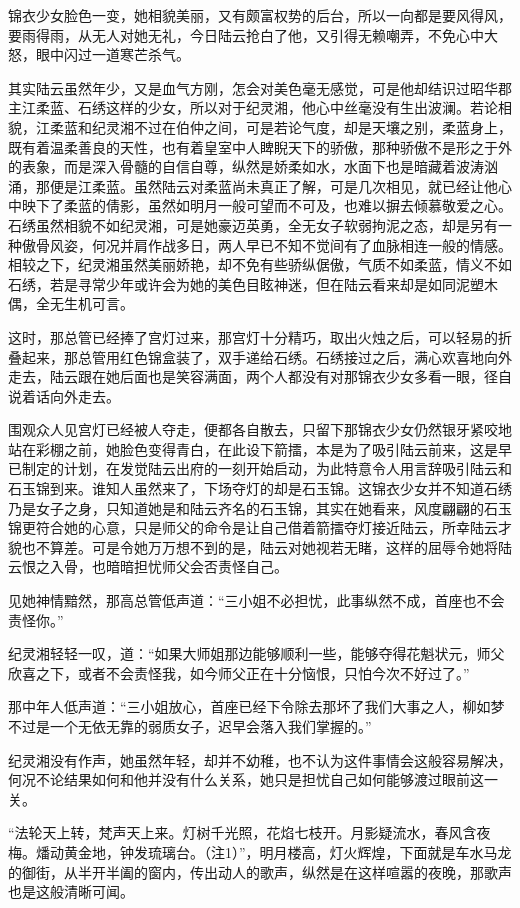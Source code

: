 锦衣少女脸色一变，她相貌美丽，又有颇富权势的后台，所以一向都是要风得风，要雨得雨，从无人对她无礼，今日陆云抢白了他，又引得无赖嘲弄，不免心中大怒，眼中闪过一道寒芒杀气。

其实陆云虽然年少，又是血气方刚，怎会对美色毫无感觉，可是他却结识过昭华郡主江柔蓝、石绣这样的少女，所以对于纪灵湘，他心中丝毫没有生出波澜。若论相貌，江柔蓝和纪灵湘不过在伯仲之间，可是若论气度，却是天壤之别，柔蓝身上，既有着温柔善良的天性，也有着皇室中人睥睨天下的骄傲，那种骄傲不是形之于外的表象，而是深入骨髓的自信自尊，纵然是娇柔如水，水面下也是暗藏着波涛汹涌，那便是江柔蓝。虽然陆云对柔蓝尚未真正了解，可是几次相见，就已经让他心中映下了柔蓝的倩影，虽然如明月一般可望而不可及，也难以摒去倾慕敬爱之心。石绣虽然相貌不如纪灵湘，可是她豪迈英勇，全无女子软弱拘泥之态，却是另有一种傲骨风姿，何况并肩作战多日，两人早已不知不觉间有了血脉相连一般的情感。相较之下，纪灵湘虽然美丽娇艳，却不免有些骄纵倨傲，气质不如柔蓝，情义不如石绣，若是寻常少年或许会为她的美色目眩神迷，但在陆云看来却是如同泥塑木偶，全无生机可言。

这时，那总管已经捧了宫灯过来，那宫灯十分精巧，取出火烛之后，可以轻易的折叠起来，那总管用红色锦盒装了，双手递给石绣。石绣接过之后，满心欢喜地向外走去，陆云跟在她后面也是笑容满面，两个人都没有对那锦衣少女多看一眼，径自说着话向外走去。

围观众人见宫灯已经被人夺走，便都各自散去，只留下那锦衣少女仍然银牙紧咬地站在彩棚之前，她脸色变得青白，在此设下箭擂，本是为了吸引陆云前来，这是早已制定的计划，在发觉陆云出府的一刻开始启动，为此特意令人用言辞吸引陆云和石玉锦到来。谁知人虽然来了，下场夺灯的却是石玉锦。这锦衣少女并不知道石绣乃是女子之身，只知道她是和陆云齐名的石玉锦，其实在她看来，风度翩翩的石玉锦更符合她的心意，只是师父的命令是让自己借着箭擂夺灯接近陆云，所幸陆云才貌也不算差。可是令她万万想不到的是，陆云对她视若无睹，这样的屈辱令她将陆云恨之入骨，也暗暗担忧师父会否责怪自己。

见她神情黯然，那高总管低声道：“三小姐不必担忧，此事纵然不成，首座也不会责怪你。”

纪灵湘轻轻一叹，道：“如果大师姐那边能够顺利一些，能够夺得花魁状元，师父欣喜之下，或者不会责怪我，如今师父正在十分恼恨，只怕今次不好过了。”

那中年人低声道：“三小姐放心，首座已经下令除去那坏了我们大事之人，柳如梦不过是一个无依无靠的弱质女子，迟早会落入我们掌握的。”

纪灵湘没有作声，她虽然年轻，却并不幼稚，也不认为这件事情会这般容易解决，何况不论结果如何和他并没有什么关系，她只是担忧自己如何能够渡过眼前这一关。

“法轮天上转，梵声天上来。灯树千光照，花焰七枝开。月影疑流水，春风含夜梅。燔动黄金地，钟发琉璃台。（注1）”，明月楼高，灯火辉煌，下面就是车水马龙的御街，从半开半阖的窗内，传出动人的歌声，纵然是在这样喧嚣的夜晚，那歌声也是这般清晰可闻。

